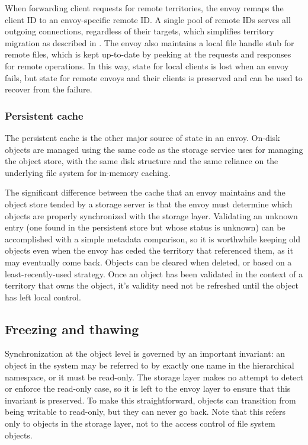 When forwarding client requests for remote territories, the envoy remaps the client ID to an envoy-specific remote ID. A single pool of remote IDs serves all outgoing connections, regardless of their targets, which simplifies territory migration as described in . The envoy also maintains a local file handle stub for remote files, which is kept up-to-date by peeking at the requests and responses for remote operations. In this way, state for local clients is lost when an envoy fails, but state for remote envoys and their clients is preserved and can be used to recover from the failure.

\subsubsection{Persistent cache}

The persistent cache is the other major source of state in an envoy. On-disk objects are managed using the same code as the storage service uses for managing the object store, with the same disk structure and the same reliance on the underlying file system for in-memory caching.

The significant difference between the cache that an envoy maintains and the object store tended by a storage server is that the envoy must determine which objects are properly synchronized with the storage layer. Validating an unknown entry (one found in the persistent store but whose status is unknown) can be accomplished with a simple metadata comparison, so it is worthwhile keeping old objects even when the envoy has ceded the territory that referenced them, as it may eventually come back. Objects can be cleared when deleted, or based on a least-recently-used strategy. Once an object has been validated in the context of a territory that owns the object, it's validity need not be refreshed until the object has left local control.

\subsection{Freezing and thawing}\label{sec:freeze-thaw}

Synchronization at the object level is governed by an important invariant: an object in the system may be referred to by exactly one name in the hierarchical namespace, or it must be read-only. The storage layer makes no attempt to detect or enforce the read-only case, so it is left to the envoy layer to ensure that this invariant is preserved. To make this straightforward, objects can transition from being writable to read-only, but they can never go back. Note that this refers only to objects in the storage layer, not to the access control of file system objects.

